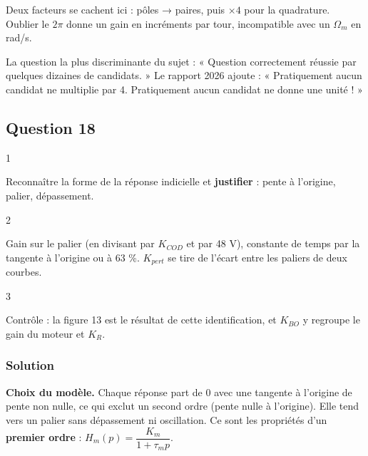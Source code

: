 \documentclass[11pt,a4paper]{article}
\begin{document}
\begin{piege}

Deux facteurs se cachent ici : pôles → paires, puis \(\times4\) pour la quadrature. Oublier le \(2\pi\) donne un gain en incréments par tour, incompatible avec un \(\Omega_m\) en rad/s.

\end{piege}

\begin{jury}

La question la plus discriminante du sujet : « Question correctement réussie par quelques dizaines de candidats. » Le rapport 2026 ajoute : « Pratiquement aucun candidat ne multiplie par 4. Pratiquement aucun candidat ne donne une unité ! »

\end{jury}

\hypertarget{question-18}{%
\subsection{Question 18}\label{question-18}}

\begin{indication}{1}

Reconnaître la forme de la réponse indicielle et \textbf{justifier} : pente à l'origine, palier, dépassement.

\end{indication}

\begin{indication}{2}

Gain sur le palier (en divisant par \(K_{COD}\) et par 48 V), constante de temps par la tangente à l'origine ou à 63 \%. \(K_{pert}\) se tire de l'écart entre les paliers de deux courbes.

\end{indication}

\begin{indication}{3}

Contrôle : la figure 13 est le résultat de cette identification, et \(K_{BO}\) y regroupe le gain du moteur et \(K_R\).

\end{indication}

\hypertarget{solution-17}{%
\subsubsection{Solution}\label{solution-17}}

\textbf{Choix du modèle.} Chaque réponse part de 0 avec une tangente à l'origine de pente non nulle, ce qui exclut un second ordre (pente nulle à l'origine). Elle tend vers un palier sans dépassement ni oscillation. Ce sont les propriétés d'un \textbf{premier ordre} : \(H_m(p)=\dfrac{K_m}{1+\tau_mp}\).
\end{document}
